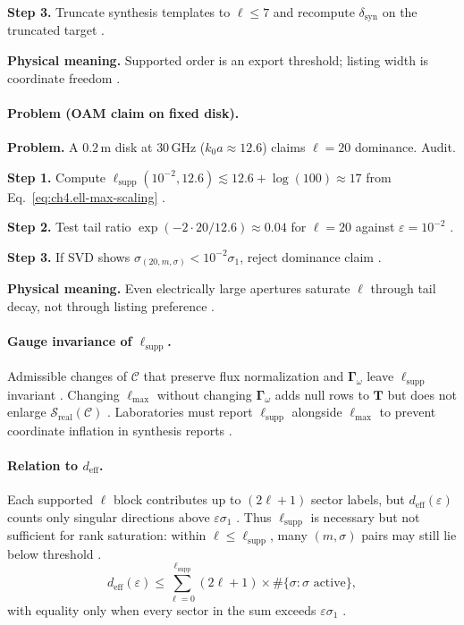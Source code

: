 \textbf{Step 3.} Truncate synthesis templates to \(\ell\le7\) and recompute \(\delta_{\mathrm{syn}}\) on the truncated target
\cite{devaney2004}.

\textbf{Physical meaning.} Supported order is an export threshold; listing width is coordinate freedom \cite{hansen1988,harrington2001}.

\paragraph{Problem (OAM claim on fixed disk).}
\textbf{Problem.} A \(0.2\,\mathrm{m}\) disk at \(30\,\mathrm{GHz}\) (\(k_{0}a\approx12.6\)) claims \(\ell=20\) dominance. Audit.

\textbf{Step 1.} Compute \(\ell_{\mathrm{supp}}(10^{-2},12.6)\lesssim12.6+\log(100)\approx17\) from Eq.~\eqref{eq:ch4.ell-max-scaling}
\cite{jackson1999,hansen1988}.

\textbf{Step 2.} Test tail ratio \(\exp(-2\cdot20/12.6)\approx0.04\) for \(\ell=20\) against \(\varepsilon=10^{-2}\) \cite{hansen1988}.

\textbf{Step 3.} If SVD shows \(\sigma_{(20,m,\sigma)}<10^{-2}\sigma_{1}\), reject dominance claim \cite{harrington2001,devaney2004}.

\textbf{Physical meaning.} Even electrically large apertures saturate \(\ell\) through tail decay, not through listing preference
\cite{stratton1941}.

\paragraph{Gauge invariance of \(\ell_{\mathrm{supp}}\).}
Admissible changes of \(\mathcal{C}\) that preserve flux normalization and \(\boldsymbol{\Gamma}_\omega\) leave \(\ell_{\mathrm{supp}}\)
invariant \cite{hansen1988,stratton1941}. Changing \(\ell_{\max}\) without changing \(\boldsymbol{\Gamma}_\omega\) adds null rows to
\(\mathbf{T}\) but does not enlarge \(\mathcal{S}_{\mathrm{real}}(\mathcal{C})\) \cite{harrington2001,devaney2004}. Laboratories must
report \(\ell_{\mathrm{supp}}\) alongside \(\ell_{\max}\) to prevent coordinate inflation in synthesis reports \cite{hansen1988}.

\paragraph{Relation to \(d_{\mathrm{eff}}\).}
Each supported \(\ell\) block contributes up to \((2\ell+1)\) sector labels, but \(d_{\mathrm{eff}}(\varepsilon)\) counts only singular
directions above \(\varepsilon\sigma_{1}\) \cite{harrington2001,devaney2004}. Thus \(\ell_{\mathrm{supp}}\) is necessary but not sufficient
for rank saturation: within \(\ell\le\ell_{\mathrm{supp}}\), many \((m,\sigma)\) pairs may still lie below threshold
\cite{hansen1988,stratton1941}.
\begin{equation}
\label{eq:ch4.ell-deff-relation}
d_{\mathrm{eff}}(\varepsilon)\le\sum_{\ell=0}^{\ell_{\mathrm{supp}}}(2\ell+1)\times\#\{\sigma:\sigma\text{ active}\},
\end{equation}
with equality only when every sector in the sum exceeds \(\varepsilon\sigma_{1}\) \cite{harrington2001}.

